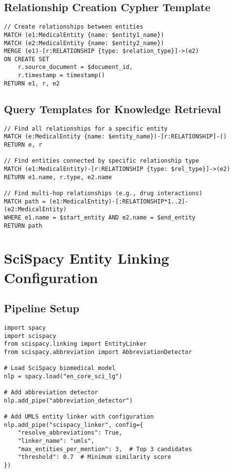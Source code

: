 \subsection{Relationship Creation Cypher Template}
\begin{verbatim}
// Create relationships between entities
MATCH (e1:MedicalEntity {name: $entity1_name})
MATCH (e2:MedicalEntity {name: $entity2_name})
MERGE (e1)-[r:RELATIONSHIP {type: $relation_type}]->(e2)
ON CREATE SET
    r.source_document = $document_id,
    r.timestamp = timestamp()
RETURN e1, r, e2
\end{verbatim}

\subsection{Query Templates for Knowledge Retrieval}
\begin{verbatim}
// Find all relationships for a specific entity
MATCH (e:MedicalEntity {name: $entity_name})-[r:RELATIONSHIP]-()
RETURN e, r

// Find entities connected by specific relationship type
MATCH (e1:MedicalEntity)-[r:RELATIONSHIP {type: $rel_type}]->(e2)
RETURN e1.name, r.type, e2.name

// Find multi-hop relationships (e.g., drug interactions)
MATCH path = (e1:MedicalEntity)-[:RELATIONSHIP*1..2]-(e2:MedicalEntity)
WHERE e1.name = $start_entity AND e2.name = $end_entity
RETURN path
\end{verbatim}

\section{SciSpacy Entity Linking Configuration}

\subsection{Pipeline Setup}
\begin{verbatim}
import spacy
import scispacy
from scispacy.linking import EntityLinker
from scispacy.abbreviation import AbbreviationDetector

# Load SciSpacy biomedical model
nlp = spacy.load("en_core_sci_lg")

# Add abbreviation detector
nlp.add_pipe("abbreviation_detector")

# Add UMLS entity linker with configuration
nlp.add_pipe("scispacy_linker", config={
    "resolve_abbreviations": True,
    "linker_name": "umls",
    "max_entities_per_mention": 3,  # Top 3 candidates
    "threshold": 0.7  # Minimum similarity score
})
\end{verbatim}

